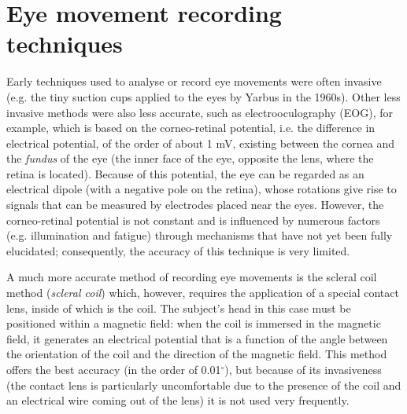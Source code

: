 \documentclass[11pt]{article}
\begin{document}
\section{Eye movement recording techniques}
Early techniques used to analyse or record eye movements were often invasive (e.g. the tiny suction cups applied to the eyes by Yarbus in the 1960s). Other less invasive methods were also less accurate, such as electrooculography (EOG), for example, which is based on the corneo-retinal potential, i.e. the difference in electrical potential, of the order of about 1 mV, existing between the cornea and the \textit{fundus} of the eye (the inner face of the eye, opposite the lens, where the retina is located). Because of this potential, the eye can be regarded as an electrical dipole (with a negative pole on the retina), whose rotations give rise to signals that can be measured by electrodes placed near the eyes. However, the corneo-retinal potential is not constant and is influenced by numerous factors (e.g. illumination and fatigue) through mechanisms that have not yet been fully elucidated; consequently, the accuracy of this technique is very limited.

A much more accurate method of recording eye movements is the scleral coil method (\textit{scleral coil}) which, however, requires the application of a special contact lens, inside of which is the coil. The subject's head in this case must be positioned within a magnetic field: when the coil is immersed in the magnetic field, it generates an electrical potential that is a function of the angle between the orientation of the coil and the direction of the magnetic field. This method offers the best accuracy (in the order of 0.01$^{\circ}$), but because of its invasiveness (the contact lens is particularly uncomfortable due to the presence of the coil and an electrical wire coming out of the lens) it is not used very frequently.
\end{document}
